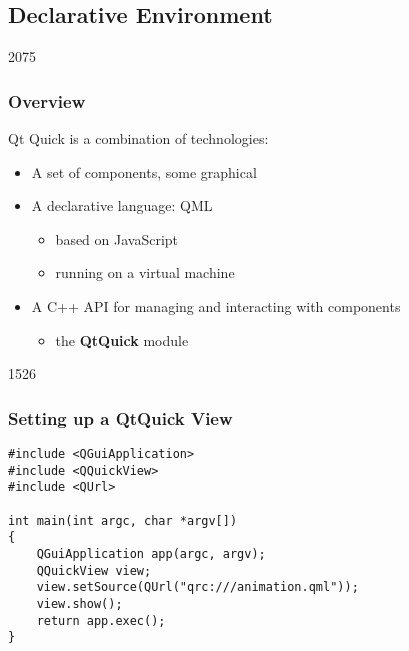 %
%
%
%

\subsection{Declarative Environment}

\begin{slide}{2075}\frametitle{Overview}

Qt Quick is a combination of technologies:

\begin{itemize}
\item A set of components, some graphical
\item A declarative language: QML
  \begin{itemize}
  \item based on JavaScript
  \item running on a virtual machine
  \end{itemize}
\item A C++ API for managing and interacting with components
  \begin{itemize}
  \item the \textbf{QtQuick} module
  \end{itemize}
\end{itemize}

\end{slide}

\begin{slide}[fragile]{1526}\frametitle{Setting up a QtQuick View}

\begin{lstlisting}
#include <QGuiApplication>
#include <QQuickView>
#include <QUrl>

int main(int argc, char *argv[])
{
    QGuiApplication app(argc, argv);
    QQuickView view;
    view.setSource(QUrl("qrc:///animation.qml"));
    view.show();
    return app.exec();
}
\end{lstlisting}

\end{slide}


